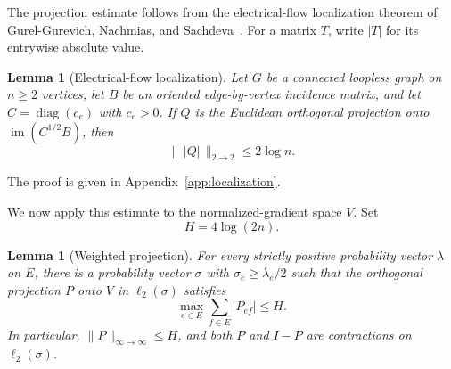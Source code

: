 \documentclass[11pt]{article}
\newtheorem{lemma}[theorem]{Lemma}
\theoremstyle{remark}
\numberwithin{equation}{section}
\begin{document}
The projection estimate follows from the electrical-flow localization theorem
of Gurel-Gurevich, Nachmias, and Sachdeva~\cite[Theorem~1.3]{GGNS}.
For a matrix $T$, write $|T|$ for its entrywise absolute value.

\begin{lemma}[Electrical-flow localization]\label{lem:localization}
Let $G$ be a connected loopless graph on $n\ge2$ vertices, let $B$ be an oriented
edge-by-vertex incidence matrix, and let $C=\operatorname{diag}(c_e)$ with
$c_e>0$. If $Q$ is the Euclidean orthogonal projection onto
$\operatorname{im}(C^{1/2}B)$, then
\begin{equation}\label{eq:localization}
  \bigl\|\,|Q|\,\bigr\|_{2\to2}\le 2\log n.
\end{equation}
\end{lemma}

The proof is given in Appendix~\ref{app:localization}.


We now apply this estimate to the normalized-gradient space $V$. Set
\begin{equation}\label{eq:H}
 H=4\log(2n).
\end{equation}

\begin{lemma}[Weighted projection]\label{lem:projection}
For every strictly positive probability vector $\lambda$ on $E$, there
is a probability vector $\sigma$ with $\sigma_e\ge\lambda_e/2$ such
that the orthogonal projection $P$ onto $V$ in $\ell_2(\sigma)$ satisfies
\begin{equation}\label{eq:projection-row-sums}
 \max_{e\in E}\sum_{f\in E}|P_{ef}|\le H.
\end{equation}
In particular, $\|P\|_{\infty\to\infty}\le H$, and both $P$ and
$I-P$ are contractions on $\ell_2(\sigma)$.
\end{lemma}
\end{document}
